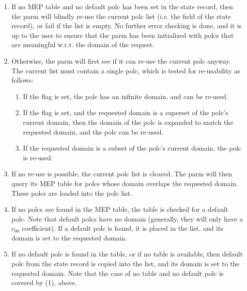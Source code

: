   \begin{enumerate}
  
  \item If no MEP table and no default polc has been set in the state record,
    then the parm will blindly re-use the current polc list (i.e. the
     field of the state record), or fail if the list is empty.  No
    further error checking is done, and it is up to the user to ensure that the
    parm has been initialized with polcs that are meaningful w.r.t. the domain
    of the request.

  \item Otherwise, the parm will first see if it can re-use the current polc 
    anyway. The current list must contain a single polc, which is tested for
    re-usability as follows:

    \begin{enumerate}
    
    \item If the  flag is set, the polc has an infinite domain, 
      and can be re-used.
      
    \item If the  flag is set, and the requested domain is a
      superset of the polc's current domain, then the domain of the polc is
      expanded to match the requested domain, and the polc can be re-used. 

    \item If the requested domain is a subset of the polc's current domain, the
      polc is re-used.

    \end{enumerate}

  \item If no re-use is possible, the current polc list is cleared. The parm
    will then query its MEP table for polcs whose domain overlaps the requested
    domain. These polcs are loaded into the polc list.

  \item If no polcs are found in the MEP table, the table is checked for a
    default polc. Note that default polcs have no domain (generally, they will
    only have a $c_{00}$ coefficient). If a default polc is found, it is placed
    in the list, and its domain is set to the requested domain.

  \item If no default polc is found in the table, or if no table is available,
    then default polc from the state record is copied into the list, and its
    domain is set to the requested domain. Note that the case of no table and
    no default polc is covered by (1), above.

  \end{enumerate}
  
